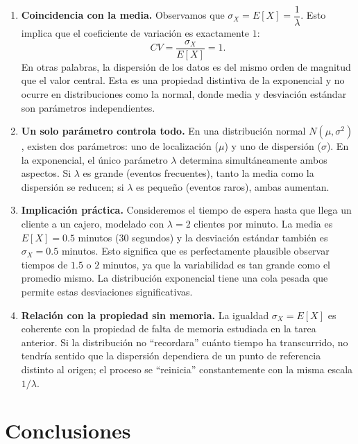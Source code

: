 \documentclass{article}
\theoremstyle{definition}
\begin{document}
    \begin{enumerate}
        \item \textbf{Coincidencia con la media.} Observamos que $\sigma_X = E[X] = \dfrac{1}{\lambda}$. Esto implica que el coeficiente de variación es exactamente $1$:
        $$ CV = \frac{\sigma_X}{E[X]} = 1. $$
        En otras palabras, la dispersión de los datos es del mismo orden de magnitud que el valor central. Esta es una propiedad distintiva de la exponencial y no ocurre en distribuciones como la normal, donde media y desviación estándar son parámetros independientes.

        \item \textbf{Un solo parámetro controla todo.} En una distribución normal $N(\mu, \sigma^2)$, existen dos parámetros: uno de localización ($\mu$) y uno de dispersión ($\sigma$). En la exponencial, el único parámetro $\lambda$ determina simultáneamente ambos aspectos. Si $\lambda$ es grande (eventos frecuentes), tanto la media como la dispersión se reducen; si $\lambda$ es pequeño (eventos raros), ambas aumentan.

        \item \textbf{Implicación práctica.} Consideremos el tiempo de espera hasta que llega un cliente a un cajero, modelado con $\lambda = 2$ clientes por minuto. La media es $E[X] = 0.5$ minutos (30 segundos) y la desviación estándar también es $\sigma_X = 0.5$ minutos. Esto significa que es perfectamente plausible observar tiempos de $1.5$ o $2$ minutos, ya que la variabilidad es tan grande como el promedio mismo. La distribución exponencial tiene una cola pesada que permite estas desviaciones significativas.

        \item \textbf{Relación con la propiedad sin memoria.} La igualdad $\sigma_X = E[X]$ es coherente con la propiedad de falta de memoria estudiada en la tarea anterior. Si la distribución no ``recordara'' cuánto tiempo ha transcurrido, no tendría sentido que la dispersión dependiera de un punto de referencia distinto al origen; el proceso se ``reinicia'' constantemente con la misma escala $1/\lambda$.
    \end{enumerate}

    \section*{Conclusiones}
\end{document}
